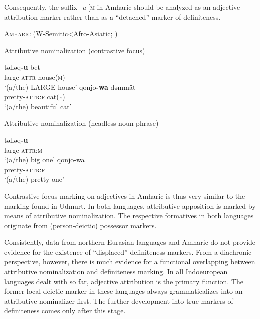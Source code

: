 {Consequently, the suffix \textit{-u} [\textsc{m} in Amharic should be analyzed as an adjective attribution marker rather than as a “detached” marker of definiteness. 
\begin{exe}
\ex	\textsc{Amharic} (W-Semitic<Afro-Asiatic; \citealt{hudson1997})
\begin{xlist}
\ex	Attributive nominalization (contrastive focus)
\begin{xlist}
\ex
\gll	təlləq\textbf{-u} bet\\
	large-\textsc{attr} house(\textsc{m})\\
\glt	‘(a/the) LARGE house’
\ex	
\gll	qonjo\textbf{-wa} dəmmät\\
	pretty-\textsc{attr:f} cat(\textsc{f})\\
\glt	‘(a/the) beautiful cat’
\end{xlist}
\ex	Attributive nominalization (headless noun phrase)
\begin{xlist}
\ex
\gll	təlləq\textbf{-u}\\
	large-\textsc{attr:m}\\
\glt	‘(a/the) big one’
\ex	
\gll	qonjo-wa\\
	pretty-\textsc{attr:f}\\
\glt	‘(a/the) pretty one’
\end{xlist}
\end{xlist}
\end{exe}
Contrastive-focus marking on adjectives in Amharic is thus very similar to the marking found in Udmurt. In both languages, attributive apposition is marked by means of attributive nominalization. The respective formatives in both languages originate from (person-deictic) possessor markers.

Consistently, data from northern Eurasian languages and Amharic do not provide evidence for the existence of “displaced” definiteness markers. From a diachronic perspective, however, there is much evidence for a functional overlapping between attributive nominalization and definiteness marking. In all Indoeuropean languages dealt with so far, adjective attribution is the primary function. The former local-deictic marker in these languages always grammaticalizes into an attributive nominalizer first. The further development into true markers of definiteness comes only after this stage.

}
